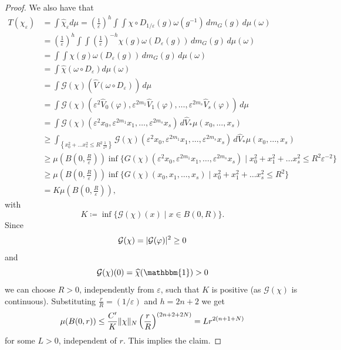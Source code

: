 \documentclass[10pt,a4paper]{amsart}
\DeclarePairedDelimiter{\abs}{\lvert}{\rvert}
\DeclarePairedDelimiter{\norm}{\lVert}{\rVert}
\renewcommand{\epsilon}{\varepsilon}
\renewcommand{\phi}{\varphi}
\begin{document}
\begin{proof}
	We also have that
	\begin{align*}
		T(\chi_\epsilon) &= \int \widehat{\chi}_\varepsilon d\mu
		= \left(\frac{1}{\epsilon}\right)^h \int \int \chi\circ D_{1/\epsilon}(g)\omega(g^{-1})\,dm_G(g)\,d\mu(\omega)\\
		&= \left(\frac{1}{\epsilon}\right)^h\int \int \left(\frac{1}{\epsilon}\right)^{-h}\chi(g)\omega(D_{\epsilon}(g))\,dm_G(g)\,d\mu(\omega)\\
		&= \int \int \chi(g)\omega(D_{\epsilon}(g))\,dm_G(g)\,d\mu(\omega)\\
		&= \int \widehat{\chi}(\omega\circ D_{\epsilon})d\mu(\omega)\\
		&= \int \mathcal{G}(\chi)(\widehat{V}(\omega\circ D_{\epsilon}))\, d\mu\\
		&= \int \mathcal{G}(\chi)(\epsilon^2\widehat{V}_0(\phi),\epsilon^{2m_1}\widehat{V}_1(\phi),\dots, \epsilon^{2m_s}\widehat{V}_s(\phi))\, d\mu\\
		&= \int \mathcal{G}(\chi)(\epsilon^2x_0,\epsilon^{2m_1}x_1,\dots, \epsilon^{2m_s}x_s)\, d\widehat{V}_*\mu(x_0,\dots, x_s)\\
		&\geq \int_{\left\{x_0^2+\dots x_s^2\leq R^2\frac{1}{\epsilon^2}\right\}} \mathcal{G}(\chi)(\epsilon^2x_0,\epsilon^{2m_1}x_1,\dots, \epsilon^{2m_s}x_s)\, d\widehat{V}_*\mu(x_0,\dots, x_s)\\
		&\geq \mu\left(B\left(0, \frac{R}{\epsilon}\right)\right)\inf\{G(\chi)(\varepsilon^2x_0,\varepsilon^{2m_1}x_1,\dots, \varepsilon^{2m_s}x_s)\mid x_0^2+x_1^2+\dots x_s^2\leq R^2\epsilon^{-2}\}\\
		&\geq \mu\left(B\left(0, \frac{R}{\epsilon}\right)\right) \inf\{G(\chi)(x_0,x_1,\dots, x_s)\mid x_0^2+x_1^2+\dots x_s^2\leq R^2\}\\
		&= K\mu\left(B\left(0, \frac{R}{\epsilon}\right)\right),
	\end{align*}
	with
	\[
	K \coloneqq \inf\{\mathcal{G}(\chi)(x)\mid x\in B(0,R)\}.
	\]
	Since 
	\[
	\mathcal{G}(\chi) = \abs{\mathcal{G}(\phi)}^2 \geq 0
	\]
	and 
	\[
	\mathcal{G}(\chi)(0) = \widehat{\chi}(\mathbbm{1})>0
	\]
	we can choose $R>0$, independently from $\epsilon$, such that $K$ is positive (as $\mathcal{G}(\chi)$ is continuous).
	Substituting $\frac{r}{R}=(1/\epsilon)$ and $h=2n+2$ we get
	\[
	\mu(B(0, r))\leq \frac{C'}{K}\norm{\chi}_N\left(\frac{r}{R}\right)^{(2n+2+2N)} = L r^{2(n+1+N)}
	\]
	for some $L>0$, independent of $r$. This implies the claim.
\end{proof}
\end{document}
